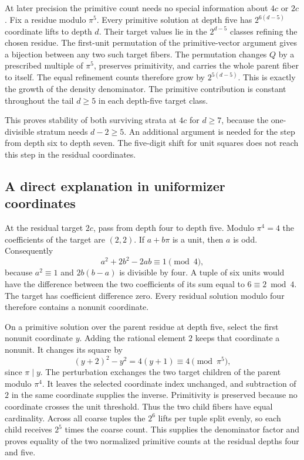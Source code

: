 \documentclass[12pt,letterpaper]{article}
\begin{document}
At later precision the primitive count needs no special information about $4c$ or $2c$. Fix a residue modulo $\pi^5$. Every primitive solution at depth five has $2^{6(d-5)}$ coordinate lifts to depth $d$. Their target values lie in the $2^{d-5}$ classes refining the chosen residue. The first-unit permutation of the primitive-vector argument gives a bijection between any two such target fibers. The permutation changes $Q$ by a prescribed multiple of $\pi^5$, preserves primitivity, and carries the whole parent fiber to itself. The equal refinement counts therefore grow by $2^{5(d-5)}$. This is exactly the growth of the density denominator. The primitive contribution is constant throughout the tail $d\geq 5$ in each depth-five target class.

This proves stability of both surviving strata at $4c$ for $d\geq 7$, because the one-divisible stratum needs $d-2\geq 5$. An additional argument is needed for the step from depth six to depth seven. The five-digit shift for unit squares does not reach this step in the residual coordinates.

\subsection{A direct explanation in uniformizer coordinates}
At the residual target $2c$, pass from depth four to depth five. Modulo $\pi^4=4$ the coefficients of the target are $(2,2)$. If $a+b\pi$ is a unit, then $a$ is odd. Consequently
\[
 a^2+2b^2-2ab\equiv 1\pmod{4},
\]
because $a^2\equiv 1$ and $2b(b-a)$ is divisible by four. A tuple of six units would have the difference between the two coefficients of its sum equal to $6\equiv 2\bmod 4$. The target has coefficient difference zero. Every residual solution modulo four therefore contains a nonunit coordinate.

On a primitive solution over the parent residue at depth five, select the first nonunit coordinate $y$. Adding the rational element $2$ keeps that coordinate a nonunit. It changes its square by
\[
 (y+2)^2-y^2=4(y+1)\equiv 4\pmod{\pi^5},
\]
since $\pi\mid y$. The perturbation exchanges the two target children of the parent modulo $\pi^4$. It leaves the selected coordinate index unchanged, and subtraction of $2$ in the same coordinate supplies the inverse. Primitivity is preserved because no coordinate crosses the unit threshold. Thus the two child fibers have equal cardinality. Across all coarse tuples the $2^6$ lifts per tuple split evenly, so each child receives $2^5$ times the coarse count. This supplies the denominator factor and proves equality of the two normalized primitive counts at the residual depths four and five.
\end{document}
